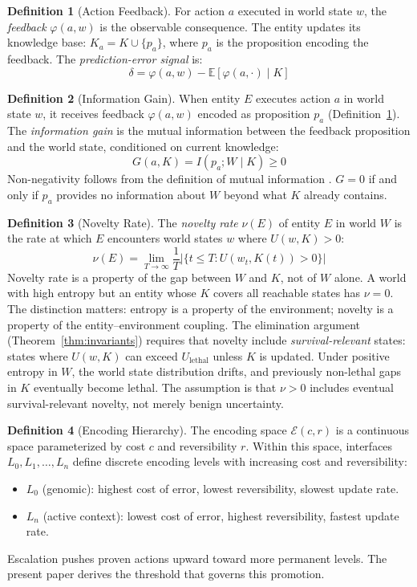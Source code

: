\documentclass[11pt]{article}
\theoremstyle{definition}
\newtheorem{definition}{Definition}
\theoremstyle{remark}
\begin{document}
\begin{definition}[Action Feedback]
\label{def:feedback}
For action $a$ executed in world state $w$, the \emph{feedback}
$\varphi(a, w)$ is the observable consequence. The entity updates its
knowledge base: $K_a = K \cup \{p_a\}$, where $p_a$ is the
proposition encoding the feedback. The \emph{prediction-error signal} is:
\[
\delta = \varphi(a, w) - \mathbb{E}[\varphi(a, \cdot) \mid K]
\]
\end{definition}

\begin{definition}[Information Gain]
\label{def:gain}
When entity $E$ executes action $a$ in world state $w$, it receives
feedback $\varphi(a, w)$ encoded as proposition $p_a$
(Definition~\ref{def:feedback}). The \emph{information gain} is the
mutual information between the feedback proposition and the world
state, conditioned on current knowledge:
\[
G(a, K) = I(p_a; W \mid K) \geq 0
\]
Non-negativity follows from the definition of mutual information
\cite{Cover2006}. $G = 0$ if and only if $p_a$ provides no
information about $W$ beyond what $K$ already contains.
\end{definition}

\begin{definition}[Novelty Rate]
\label{def:novelty}
The \emph{novelty rate} $\nu(E)$ of entity $E$ in world $W$ is the rate
at which $E$ encounters world states $w$ where $U(w, K) > 0$:
\[
\nu(E) = \lim_{T \to \infty} \frac{1}{T}
\bigl|\{t \leq T : U(w_t, K(t)) > 0\}\bigr|
\]
Novelty rate is a property of the gap between $W$ and $K$, not of $W$
alone. A world with high entropy but an entity whose $K$ covers all
reachable states has $\nu = 0$. The distinction matters: entropy is
a property of the environment; novelty is a property of the
entity--environment coupling. The elimination argument
(Theorem~\ref{thm:invariants}) requires that novelty include
\emph{survival-relevant} states: states where $U(w, K)$ can exceed
$U_{\mathrm{lethal}}$ unless $K$ is updated. Under positive entropy in
$W$, the world state distribution drifts, and previously non-lethal gaps
in $K$ eventually become lethal. The assumption is that $\nu > 0$
includes eventual survival-relevant novelty, not merely benign
uncertainty.
\end{definition}

\begin{definition}[Encoding Hierarchy]
\label{def:hierarchy}
The encoding space $\mathcal{E}(c, r)$ is a continuous space
parameterized by cost $c$ and reversibility $r$. Within this space,
interfaces $L_0, L_1, \ldots, L_n$ define discrete encoding levels
with increasing cost and reversibility:
\begin{itemize}
\item $L_0$ (genomic): highest cost of error, lowest reversibility,
   slowest update rate.
\item $L_n$ (active context): lowest cost of error, highest
   reversibility, fastest update rate.
\end{itemize}
Escalation \cite{McCarthy2026c} pushes proven actions
upward toward more permanent levels. The present paper derives the
threshold that governs this promotion.
\end{definition}
\end{document}
